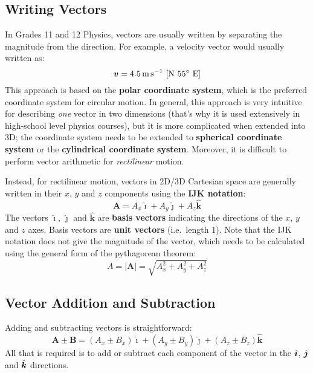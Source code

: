 \documentclass{../../oss-handout}
\newcommand{\iii}{\ensuremath\hat{\bm{\imath}}}
\newcommand{\jjj}{\ensuremath\hat{\bm{\jmath}}}
\newcommand{\kkk}{\ensuremath\hat{\bm{k}}}
\begin{document}
\subsection{Writing Vectors}
In Grades 11 and 12 Physics, vectors are usually written by separating the
magnitude from the direction. For example, a velocity vector would usually
written as:
\begin{equation*}
  \bm{v}=\SI{4.5}{\metre\per\second}\text{ [N \ang{55} E]}
\end{equation*}
This approach is based on the \textbf{polar coordinate system}, which is the
preferred coordinate system for circular motion. In general, this approach is
very intuitive for describing \emph{one} vector in
two dimensions (that's why it is used extensively in high-school level
physics courses), but it is more complicated when extended into 3D; the
coordinate system needs to be extended to \textbf{spherical coordinate system}
or the \textbf{cylindrical coordinate system}. Moreover, it is difficult to
perform vector arithmetic for \emph{rectilinear} motion.

Instead, for rectilinear motion, vectors in 2D/3D Cartesian space are generally
written in their $x$, $y$ and $z$ components using the \textbf{IJK notation}:
\begin{equation*}
  \bm{A}=A_x\bm{\hat{\imath}} + A_y\bm{\hat{\jmath}} + A_z\bm{\hat{k}}
\end{equation*}
The vectors $\bm{\hat{\imath}}$, $\bm{\hat{\jmath}}$ and $\bm{\hat{k}}$ are
\textbf{basis vectors} indicating the directions of the $x$, $y$ and $z$ axes.
Basis vectors are \textbf{unit vectors} (i.e.\ length $1$). Note that the
IJK notation does not give the magnitude of the vector, which needs to be
calculated using the general form of the pythagorean theorem:
\begin{equation*}
  A=|\bm{A}|=\sqrt{A_x^2 + A_y^2 + A_z^2}
\end{equation*}


\subsection{Vector Addition and Subtraction}

Adding and subtracting vectors is straightforward:
\begin{equation*}
  \bm{A}\pm\bm{B}=
  (A_x\pm B_x)\bm{\hat{\imath}} +
  (A_y\pm B_y)\bm{\hat{\jmath}} +
  (A_z\pm B_z)\bm{\hat{k}}
\end{equation*}
All that is required is to add or subtract each component of the vector in the
$\iii$, $\jjj$ and $\kkk$ directions.
\end{document}
